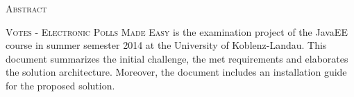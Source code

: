 \vspace*{\fill}
\begin{center}
{\huge \textsc{Abstract}}
\\ \vspace*{7mm}
\begin{minipage}[m]{0.9\textwidth}
\large
\textsc{Votes - Electronic Polls Made Easy} is the examination project of the JavaEE course in summer semester 2014 at the University of Koblenz-Landau.
This document summarizes the initial challenge, the met requirements and elaborates the solution architecture.
Moreover, the document includes an installation guide for the proposed solution.
\end{minipage}
\end{center}
\vspace*{\fill}
